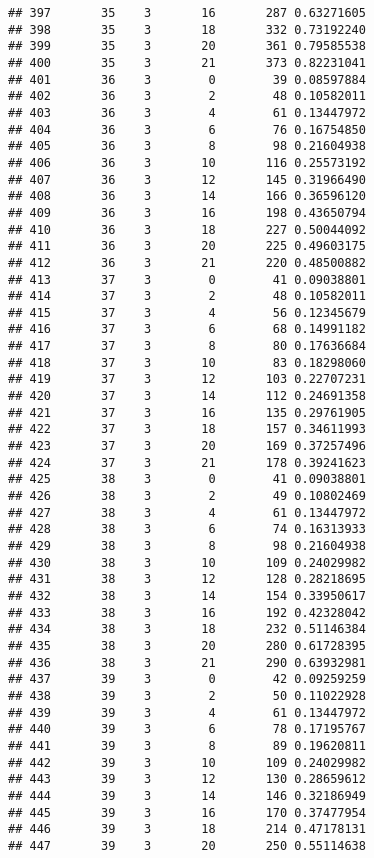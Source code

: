 \documentclass[
]{article}
\begin{document}
\begin{verbatim}
## 397       35    3       16       287 0.63271605
## 398       35    3       18       332 0.73192240
## 399       35    3       20       361 0.79585538
## 400       35    3       21       373 0.82231041
## 401       36    3        0        39 0.08597884
## 402       36    3        2        48 0.10582011
## 403       36    3        4        61 0.13447972
## 404       36    3        6        76 0.16754850
## 405       36    3        8        98 0.21604938
## 406       36    3       10       116 0.25573192
## 407       36    3       12       145 0.31966490
## 408       36    3       14       166 0.36596120
## 409       36    3       16       198 0.43650794
## 410       36    3       18       227 0.50044092
## 411       36    3       20       225 0.49603175
## 412       36    3       21       220 0.48500882
## 413       37    3        0        41 0.09038801
## 414       37    3        2        48 0.10582011
## 415       37    3        4        56 0.12345679
## 416       37    3        6        68 0.14991182
## 417       37    3        8        80 0.17636684
## 418       37    3       10        83 0.18298060
## 419       37    3       12       103 0.22707231
## 420       37    3       14       112 0.24691358
## 421       37    3       16       135 0.29761905
## 422       37    3       18       157 0.34611993
## 423       37    3       20       169 0.37257496
## 424       37    3       21       178 0.39241623
## 425       38    3        0        41 0.09038801
## 426       38    3        2        49 0.10802469
## 427       38    3        4        61 0.13447972
## 428       38    3        6        74 0.16313933
## 429       38    3        8        98 0.21604938
## 430       38    3       10       109 0.24029982
## 431       38    3       12       128 0.28218695
## 432       38    3       14       154 0.33950617
## 433       38    3       16       192 0.42328042
## 434       38    3       18       232 0.51146384
## 435       38    3       20       280 0.61728395
## 436       38    3       21       290 0.63932981
## 437       39    3        0        42 0.09259259
## 438       39    3        2        50 0.11022928
## 439       39    3        4        61 0.13447972
## 440       39    3        6        78 0.17195767
## 441       39    3        8        89 0.19620811
## 442       39    3       10       109 0.24029982
## 443       39    3       12       130 0.28659612
## 444       39    3       14       146 0.32186949
## 445       39    3       16       170 0.37477954
## 446       39    3       18       214 0.47178131
## 447       39    3       20       250 0.55114638

\end{verbatim}
\end{document}
